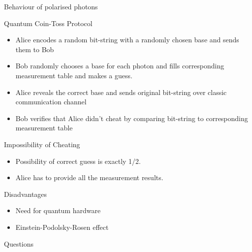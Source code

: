 \documentclass{beamer}
\begin{document}
\begin{frame}{Behaviour of polarised photons}



\end{frame}

\begin{frame}{Quantum Coin-Toss Protocol}
\begin{itemize}
    \item Alice encodes a random bit-string with a randomly chosen base and sends them to Bob
    \item Bob randomly chooses a base for each photon and fills corresponding measurement table and makes a guess.
    \item Alice reveals the correct base and sends original bit-string over classic communication channel
    \item Bob verifies that Alice didn't cheat by comparing bit-string to corresponding measurement table
\end{itemize}
\end{frame}

\begin{frame}{Impossibility of Cheating}
\begin{itemize}
    \item Possibility of correct guess is exactly 1/2.
    \item Alice has to provide all the measurement results.
\end{itemize}
\end{frame}

\begin{frame}{Disadvantages}
\begin{itemize}
    \item Need for quantum hardware
    \item Einstein-Podolsky-Rosen effect
\end{itemize}
\end{frame}

\begin{frame}{Questions}

\end{frame}
 
\end{document}
